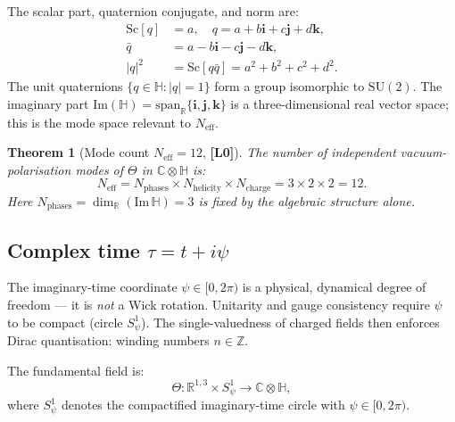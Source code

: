 \documentclass[11pt,a4paper]{article}
\newtheorem{theorem}{Theorem}
\theoremstyle{definition}
\theoremstyle{remark}
\newcommand{\Lzero}{\textbf{[L0]}}
\begin{document}
The scalar part, quaternion conjugate, and norm are:
\begin{align}
  \mathrm{Sc}[q] &= a, \quad q = a + b\mathbf{i} + c\mathbf{j} + d\mathbf{k}, \\
  \bar{q} &= a - b\mathbf{i} - c\mathbf{j} - d\mathbf{k}, \\
  |q|^2 &= \mathrm{Sc}[q\bar{q}] = a^2 + b^2 + c^2 + d^2.
\end{align}
The unit quaternions $\{q \in \mathbb{H} : |q| = 1\}$ form a group isomorphic to
$\mathrm{SU}(2)$. The imaginary part
$\mathrm{Im}(\mathbb{H}) = \mathrm{span}_\mathbb{R}\{\mathbf{i},\mathbf{j},\mathbf{k}\}$
is a three-dimensional real vector space; this is the mode space relevant to $N_{\mathrm{eff}}$.

\begin{theorem}[Mode count $N_{\mathrm{eff}} = 12$, {\Lzero}]
  \label{thm:neff}
  The number of independent vacuum-polarisation modes of $\Theta$ in
  $\mathbb{C}\otimes\mathbb{H}$ is:
  \begin{equation}
    N_{\mathrm{eff}}
    = N_{\mathrm{phases}} \times N_{\mathrm{helicity}} \times N_{\mathrm{charge}}
    = 3 \times 2 \times 2 = 12.
  \end{equation}
  Here $N_{\mathrm{phases}} = \dim_\mathbb{R}(\mathrm{Im}\,\mathbb{H}) = 3$
  is fixed by the algebraic structure alone.
\end{theorem}


\subsection{Complex time $\tau = t + i\psi$}
\label{sec:complex_time}


The imaginary-time coordinate $\psi \in [0, 2\pi)$ is a physical, dynamical
degree of freedom — it is \emph{not} a Wick rotation. Unitarity and gauge
consistency require $\psi$ to be compact (circle $S^1_\psi$). The
single-valuedness of charged fields then enforces Dirac quantisation:
winding numbers $n \in \mathbb{Z}$.

The fundamental field is:
\begin{equation}
  \Theta: \mathbb{R}^{1,3} \times S^1_\psi \to \mathbb{C}\otimes\mathbb{H},
\end{equation}
where $S^1_\psi$ denotes the compactified imaginary-time circle
with $\psi \in [0, 2\pi)$.
\end{document}
